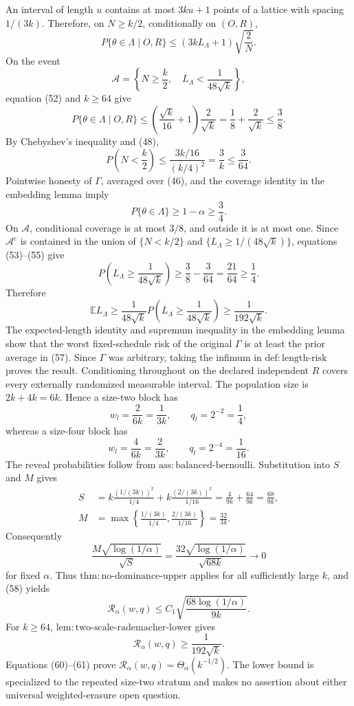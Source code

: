An interval of length \(u\) contains at most \(3ku+1\) points of a lattice with spacing \(1/(3k)\). Therefore, on \(N\ge k/2\), conditionally on \((O,R)\),
\[
 P\{\theta\in\Lambda\mid O,R\}
 \le(3kL_\Lambda+1)\sqrt{\frac2N}.
\tag{52}
\]
On the event
\[
 \mathcal A=\left\{N\ge\frac k2,\quad
 L_\Lambda<\frac1{48\sqrt{k}}\right\},
\]
equation (52) and \(k\ge64\) give
\[
 P\{\theta\in\Lambda\mid O,R\}
 \le\left(\frac{\sqrt{k}}{16}+1\right)\frac2{\sqrt{k}}
 =\frac18+\frac2{\sqrt{k}}
 \le\frac38.
\tag{53}
\]
By Chebyshev's inequality and (48),
\[
 P\left(N<\frac k2\right)
 \le\frac{3k/16}{(k/4)^2}
 =\frac3k\le\frac3{64}.
\tag{54}
\]
Pointwise honesty of \(\Gamma\), averaged over (46), and the coverage identity in the embedding lemma imply
\[
 P\{\theta\in\Lambda\}\ge1-\alpha\ge\frac34.
\tag{55}
\]
On \(\mathcal A\), conditional coverage is at most \(3/8\), and outside it is at most one. Since \(\mathcal A^c\) is contained in the union of \(\{N<k/2\}\) and \(\{L_\Lambda\ge1/(48\sqrt{k})\}\), equations (53)--(55) give
\[
 P\left(L_\Lambda\ge\frac1{48\sqrt{k}}\right)
 \ge\frac38-\frac3{64}=\frac{21}{64}\ge\frac14.
\tag{56}
\]
Therefore
\[
 \mathbb E L_\Lambda
 \ge\frac1{48\sqrt{k}}
 P\left(L_\Lambda\ge\frac1{48\sqrt{k}}\right)
 \ge\frac1{192\sqrt{k}}.
\tag{57}
\]
The expected-length identity and supremum inequality in the embedding lemma show that the worst fixed-schedule risk of the original \(\Gamma\) is at least the prior average in (57). Since \(\Gamma\) was arbitrary, taking the infimum in \(\mathrm{def{:}length\text{-}risk}\) proves the result. Conditioning throughout on the declared independent \(R\) covers every externally randomized measurable interval.
The population size is \(2k+4k=6k\). Hence a size-two block has
\[
 w_l=\frac2{6k}=\frac1{3k},\qquad q_l=2^{-2}=\frac14,
\]
whereas a size-four block has
\[
 w_l=\frac4{6k}=\frac2{3k},\qquad q_l=2^{-4}=\frac1{16}.
\]
The reveal probabilities follow from \(\mathrm{ass{:}balanced\text{-}bernoulli}\). Substitution into \(S\) and \(M\) gives
\[
\begin{aligned}
 S
 &=k\frac{(1/(3k))^2}{1/4}
   +k\frac{(2/(3k))^2}{1/16}
   =\frac4{9k}+\frac{64}{9k}
   =\frac{68}{9k},\\
 M
 &=\max\left\{\frac{1/(3k)}{1/4},
                \frac{2/(3k)}{1/16}\right\}
   =\frac{32}{3k}.
\end{aligned}
\tag{58}
\]
Consequently
\[
 \frac{M\sqrt{\log(1/\alpha)}}{\sqrt S}
 =\frac{32\sqrt{\log(1/\alpha)}}{\sqrt{68k}}
 \longrightarrow0
\tag{59}
\]
for fixed \(\alpha\). Thus \(\mathrm{thm{:}no\text{-}dominance\text{-}upper}\) applies for all sufficiently large \(k\), and (58) yields
\[
 \mathcal R_\alpha(w,q)
 \le C_1\sqrt{\frac{68\log(1/\alpha)}{9k}}.
\tag{60}
\]
For \(k\ge64\), \(\mathrm{lem{:}two\text{-}scale\text{-}rademacher\text{-}lower}\) gives
\[
 \mathcal R_\alpha(w,q)\ge\frac1{192\sqrt{k}}.
\tag{61}
\]
Equations (60)--(61) prove \(\mathcal R_\alpha(w,q)=\Theta_\alpha(k^{-1/2})\). The lower bound is specialized to the repeated size-two stratum and makes no assertion about either universal weighted-erasure open question.

